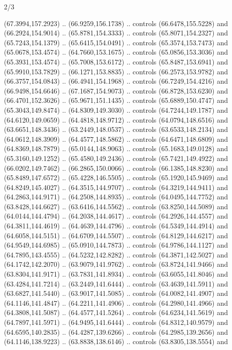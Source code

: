 \begin{flagdescription}{2/3}
\begin{scope}[shift={(0.5\flaglength,0.5)},scale=\flagwidth/320]
\begin{scope}[y=0.8pt, x=0.8pt, yscale=-1,shift={(-118.3,-146)}]
  (67.3994,157.2923) .. (66.9259,156.1738) .. controls (66.6478,155.5228) and
  (66.2924,154.9014) .. (65.8781,154.3333) .. controls (65.8071,154.2327) and
  (65.7243,154.1379) .. (65.6415,154.0491) .. controls (65.3574,153.7473) and
  (65.0678,153.4574) .. (64.7660,153.1675) .. controls (65.0856,153.3036) and
  (65.3931,153.4574) .. (65.7008,153.6172) .. controls (65.8487,153.6941) and
  (65.9910,153.7829) .. (66.1271,153.8835) .. controls (66.2573,153.9782) and
  (66.3757,154.0843) .. (66.4941,154.1968) .. controls (66.7249,154.4216) and
  (66.9498,154.6646) .. (67.1687,154.9073) .. controls (66.8728,153.6230) and
  (66.4701,152.3626) .. (65.9671,151.1435) .. controls (65.6889,150.4747) and
  (65.3043,149.8474) .. (64.8309,149.3030) .. controls (64.7244,149.1787) and
  (64.6120,149.0659) .. (64.4818,148.9712) .. controls (64.0794,148.6516) and
  (63.6651,148.3436) .. (63.2449,148.0537) .. controls (63.6533,148.2134) and
  (64.0612,148.3909) .. (64.4577,148.5862) .. controls (64.6471,148.6809) and
  (64.8369,148.7879) .. (65.0144,148.9063) .. controls (65.1683,149.0128) and
  (65.3160,149.1252) .. (65.4580,149.2436) .. controls (65.7421,149.4922) and
  (66.0202,149.7462) .. (66.2865,150.0066) .. controls (66.1385,148.8230) and
  (65.8489,147.6572) .. (65.4228,146.5505) .. controls (65.1920,145.9469) and
  (64.8249,145.4027) .. (64.3515,144.9707) .. controls (64.3219,144.9411) and
  (64.2863,144.9171) .. (64.2508,144.8935) .. controls (64.0495,144.7752) and
  (63.8428,144.6627) .. (63.6416,144.5562) .. controls (63.8250,144.5089) and
  (64.0144,144.4794) .. (64.2038,144.4617) .. controls (64.2926,144.4557) and
  (64.3811,144.4619) .. (64.4639,144.4796) .. controls (64.5349,144.4914) and
  (64.6058,144.5151) .. (64.6709,144.5507) .. controls (64.8129,144.6217) and
  (64.9549,144.6985) .. (65.0910,144.7873) .. controls (64.9786,144.1127) and
  (64.7895,143.4555) .. (64.5232,142.8282) .. controls (64.3871,142.5027) and
  (64.1742,142.2070) .. (63.9079,141.9762) .. controls (63.8724,141.9466) and
  (63.8304,141.9171) .. (63.7831,141.8934) .. controls (63.6055,141.8046) and
  (63.4284,141.7214) .. (63.2449,141.6444) .. controls (63.4639,141.5911) and
  (63.6827,141.5440) .. (63.9017,141.5085) .. controls (64.0082,141.4907) and
  (64.1146,141.4847) .. (64.2211,141.4906) .. controls (64.2980,141.4966) and
  (64.3808,141.5087) .. (64.4577,141.5264) .. controls (64.6234,141.5619) and
  (64.7897,141.5971) .. (64.9495,141.6444) .. controls (64.8312,140.9579) and
  (64.6595,140.2835) .. (64.4287,139.6266) .. controls (64.2985,139.2656) and
  (64.1146,138.9223) .. (63.8838,138.6146) .. controls (63.8305,138.5554) and

\end{scope}
\end{scope}
\end{flagdescription}
